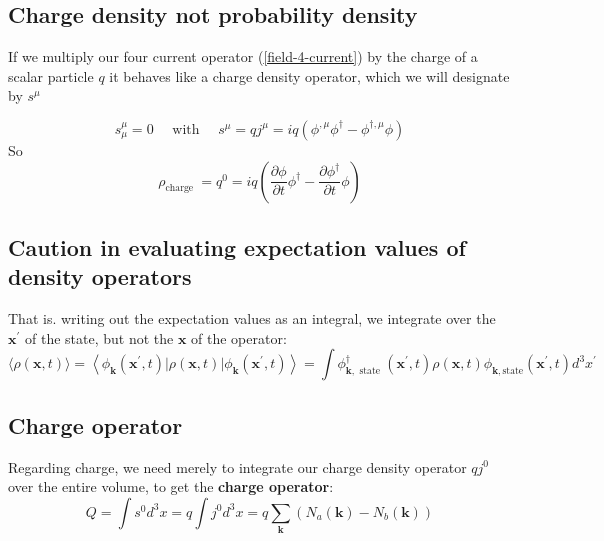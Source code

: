\subsection{Charge density not probability density}
If we multiply our four current operator (\ref{field-4-current}) by the charge of a scalar particle $q$ it behaves like a charge density operator, which we will designate by $s^{\mu}$
\begin{qt}
    \begin{equation}
s_{\mu}^{\mu}=0 \quad \text { with } \quad s^{\mu}=q j^{\mu}=i q\left(\phi^{, \mu} \phi^{\dagger}-\phi^{\dagger,\mu}  \phi\right)
\end{equation}
So
\begin{equation}
\rho_{\text {charge }}=q^{0}=i q\left(\frac{\partial \phi}{\partial t} \phi^{\dagger}-\frac{\partial \phi^{\dagger}}{\partial t} \phi\right)
\end{equation}
\end{qt}
\subsection{Caution in evaluating expectation values of density operators}
 That is. writing out the expectation values as an integral, we integrate over the $\mathbf{x}^{\prime}$ of the state, but not the $\mathbf{x}$ of the operator:
\begin{equation}
\langle\rho(\mathbf{x}, t)\rangle=\left\langle\phi_{\mathbf{k}}\left(\mathbf{x}^{\prime}, t\right)|\rho(\mathbf{x}, t)| \phi_{\mathbf{k}}\left(\mathbf{x}^{\prime}, t\right)\right\rangle=\int \phi_{\mathbf{k}, \text { state }}^{\dagger}\left(\mathbf{x}^{\prime}, t\right) \rho(\mathbf{x}, t) \phi_{\mathbf{k}, \text {state}}\left(\mathbf{x}^{\prime}, t\right) d^{3} x^{\prime}
\end{equation}

\subsection{Charge operator}
Regarding charge, we need merely to integrate our charge density operator $qj^0$ over the entire volume, to get the \textbf{charge operator}:
\begin{equation}
Q=\int s^{0} d^{3} x=q \int j^{0} d^{3} x=q \sum_{\mathbf{k}}\left(N_{a}(\mathbf{k})-N_{b}(\mathbf{k})\right)
\end{equation}

